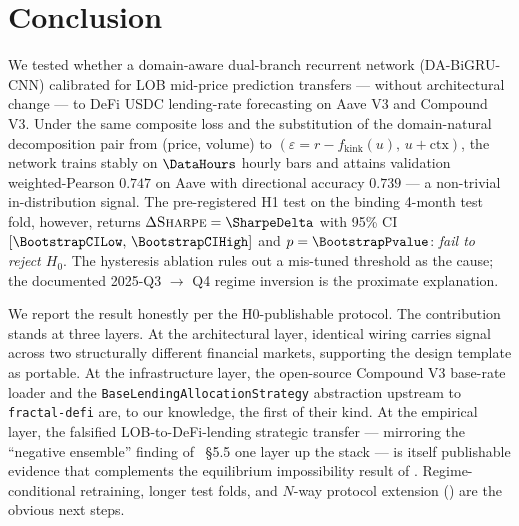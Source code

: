 \section{Conclusion}
\label{sec:conclusion}

We tested whether a domain-aware dual-branch recurrent network
(DA-BiGRU-CNN) calibrated for LOB mid-price prediction
\cite{solovev2026lob} transfers --- without architectural change --- to
DeFi USDC lending-rate forecasting on Aave V3 and Compound V3.  Under
the same composite loss and the substitution of the domain-natural
decomposition pair from (price, volume) to
$(\varepsilon = r - f_{\text{kink}}(u),\, u + \text{ctx})$, the
network trains stably on $\DataHours$ hourly bars and attains
validation weighted-Pearson $0.747$ on Aave with directional accuracy
$0.739$ --- a non-trivial in-distribution signal.  The pre-registered
H1 test on the binding 4-month test fold, however, returns
$\Delta\textsc{Sharpe}=\SharpeDelta$ with 95\% CI
$[\BootstrapCILow,\,\BootstrapCIHigh]$ and $p=\BootstrapPvalue$:
\emph{fail to reject $H_0$}.  The hysteresis ablation rules out a
mis-tuned threshold as the cause; the documented 2025-Q3 $\to$ Q4
regime inversion is the proximate explanation.

We report the result honestly per the H0-publishable protocol.  The
contribution stands at three layers.  At the architectural layer,
identical wiring carries signal across two structurally different
financial markets, supporting the design template as portable.  At the
infrastructure layer, the open-source Compound V3 base-rate loader
and the \texttt{Base\-Lending\-Allocation\-Strategy} abstraction
upstream to \texttt{fractal-defi} \cite{krestenko2026fractaldefi} are,
to our knowledge, the first of their kind.  At the empirical layer,
the falsified LOB-to-DeFi-lending strategic transfer --- mirroring the
``negative ensemble'' finding of \cite{solovev2026lob}~\S5.5 one layer
up the stack --- is itself publishable evidence that complements the
equilibrium impossibility result of \cite{halpern2024fair}.  Regime-
conditional retraining, longer test folds, and $N$-way protocol
extension () are the obvious next steps.
